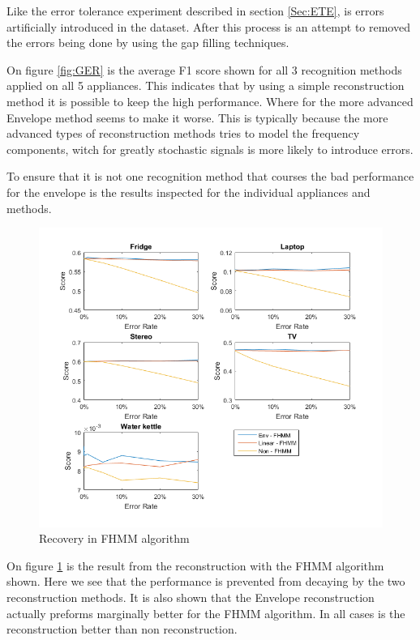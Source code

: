 Like the error tolerance experiment described in section \ref{Sec:ETE}, is errors artificially introduced in the dataset. After this process is an attempt to removed the errors being done by using the gap filling techniques. 

On figure \ref{fig:GER} is the average F1 score shown for all 3 recognition methods applied on all 5 appliances. This indicates that by using a simple reconstruction method it is possible to keep the high performance. Where for the more advanced Envelope method seems to make it worse. This is typically because the more advanced types of reconstruction methods tries to model the frequency components, witch for greatly stochastic signals is more likely to introduce errors. 

To ensure that it is not one recognition method that courses the bad performance for the envelope is the results inspected for the individual appliances and methods. 


\newpage

\begin{figure}[H]
\centering
\includegraphics[width=1\textwidth]{billeder/Rec-FHMM.png}
\caption{Recovery in FHMM algorithm}
\label{fig:ERFHMM}
\end{figure}

On figure \ref{fig:ERFHMM} is the result from the reconstruction with the FHMM algorithm shown. Here we see that the performance is prevented from decaying by the two reconstruction methods. It is also shown that the Envelope reconstruction actually preforms marginally better for the FHMM algorithm. In all cases is the reconstruction better than non reconstruction. 

